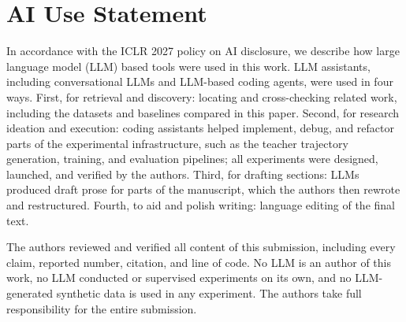 
\section*{AI Use Statement}

In accordance with the ICLR 2027 policy on AI disclosure, we describe how large language model (LLM) based tools were used in this work. LLM assistants, including conversational LLMs and LLM-based coding agents, were used in four ways. First, for retrieval and discovery: locating and cross-checking related work, including the datasets and baselines compared in this paper. Second, for research ideation and execution: coding assistants helped implement, debug, and refactor parts of the experimental infrastructure, such as the teacher trajectory generation, training, and evaluation pipelines; all experiments were designed, launched, and verified by the authors. Third, for drafting sections: LLMs produced draft prose for parts of the manuscript, which the authors then rewrote and restructured. Fourth, to aid and polish writing: language editing of the final text.

The authors reviewed and verified all content of this submission, including every claim, reported number, citation, and line of code. No LLM is an author of this work, no LLM conducted or supervised experiments on its own, and no LLM-generated synthetic data is used in any experiment. The authors take full responsibility for the entire submission.
